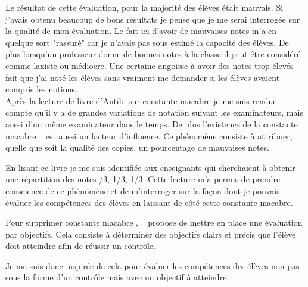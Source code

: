 Le résultat de cette évaluation, pour la majorité des élèves était mauvais.
Si j'avais obtenu beaucoup de bons résultats je pense que je me serai interrogée sur la qualité de mon évaluation.
Le fait ici d'avoir de mauvaises notes m'a en quelque sort "rassuré" car je n'avais pas sous estimé la capacité des élèves.
De plus lorsqu'un professeur donne de bonnes notes à la classe il peut être considéré comme laxiste ou médiocre.
Une certaine angoisse à avoir des notes trop élevés fait que j'ai noté les élèves sans vraiment me demander si les élèves avaient compris les notions.\\

Après la lecture de livre d'Antibi sur \og constante macabre \fg je me suis rendue compte qu'il y a de grandes variations de notation suivant les examinateurs, mais aussi d'un même examinateur dans le temps.
De plus l'existence de la \og constante macabre \fg~\cite{antibi2003constante} est aussi un facteur d'influence.
Ce phénomène consiste à attribuer, quelle que soit la qualité des copies, un pourcentage de mauvaises notes.

En lisant ce livre je me suis identifiée aux enseignants qui cherchaient à obtenir une répartition des notes /3, 1/3, 1/3\fg.
Cette lecture m'a permis de prendre conscience de ce phénomène et de m'interroger sur la façon dont je pouvais évaluer les compétences des élèves en laissant de côté cette constante macabre.

\newpage
Pour supprimer \og constante macabre \fg, ~\cite{antibi2007notes} propose de mettre en place une évaluation par objectifs.
Cela consiste à déterminer des objectifs clairs et précis que l'élève doit atteindre afin de réussir un contrôle.

Je me suis donc inspirée de cela pour évaluer les compétences des élèves non pas sous la forme d'un contrôle mais avec un objectif à atteindre.

 